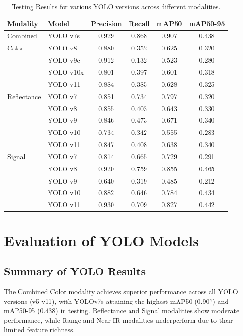 \documentclass[11pt]{article}
\begin{document}
\begin{table}[h!]
    \centering
    \small
    \caption{Testing Results for various YOLO versions across different modalities.}
    \begin{tabular}{@{}llcccc@{}}
        \toprule
        \textbf{Modality} & \textbf{Model} & \textbf{Precision} & \textbf{Recall} & \textbf{mAP50} & \textbf{mAP50-95} \\ \midrule
        Combined & YOLO v7s & 0.929 & 0.868 & 0.907 & 0.438 \\
        Color    & YOLO v8l & 0.880 & 0.352 & 0.625 & 0.320 \\
                 & YOLO v9c & 0.912 & 0.132 & 0.523 & 0.280 \\
                 & YOLO v10x & 0.801 & 0.397 & 0.601 & 0.318 \\
                 & YOLO v11 & 0.884 & 0.385 & 0.628 & 0.325 \\ \midrule
        Reflectance & YOLO v7 & 0.851 & 0.734 & 0.797 & 0.320 \\
                    & YOLO v8 & 0.855 & 0.403 & 0.643 & 0.330 \\
                    & YOLO v9 & 0.846 & 0.473 & 0.671 & 0.340 \\
                    & YOLO v10 & 0.734 & 0.342 & 0.555 & 0.283 \\
                    & YOLO v11 & 0.847 & 0.408 & 0.638 & 0.340 \\ \midrule
        Signal      & YOLO v7 & 0.814 & 0.665 & 0.729 & 0.291 \\
                    & YOLO v8 & 0.920 & 0.759 & 0.855 & 0.465 \\
                    & YOLO v9 & 0.640 & 0.319 & 0.485 & 0.212 \\
                    & YOLO v10 & 0.882 & 0.646 & 0.784 & 0.434 \\
                    & YOLO v11 & 0.930 & 0.709 & 0.827 & 0.442 \\ \bottomrule
    \end{tabular}
    \label{tab:yolo_results}
\end{table}

\section{Evaluation of YOLO Models}

\subsection{Summary of YOLO Results}
The Combined Color modality achieves superior performance across all YOLO versions (v5-v11), with YOLOv7s attaining the highest mAP50 (0.907) and mAP50-95 (0.438) in testing. Reflectance and Signal modalities show moderate performance, while Range and Near-IR modalities underperform due to their limited feature richness.
\end{document}
